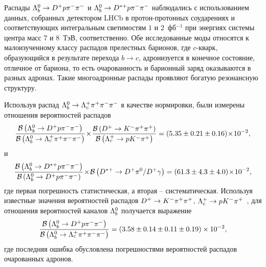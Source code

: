 \clearpage
{}
\label{sec:conclusion}

Распады $\Lb\to\Dp\p\pim\pim$ и $\Lb\to\Dstarp\p\pim\pim$ наблюдались 
с использованием данных, собранных детектором LHCb в протон-протонных 
соударениях и соответствующих интегральным светимостям $1$ 
и $2$~фб$^{-1}$ при энергиях системы центра масс 7 и 8~ТэВ, 
соответственно. Обе исследованные моды относятся к малоизученному классу 
распадов прелестных барионов, где $c$\nobreakdash-кварк, образующийся 
в результате перехода $b \to c$, адронизуется в конечное состояние, 
отличное от бариона, то есть очарованность и барионный заряд оказываются 
в разных адронах. Такие многоадронные распады проявляют богатую 
резонансную структуру.

Используя распад $\Lb\to\Lc\pip\pim\pim$ в качестве нормировки, 
были измерены отношения вероятностей распадов
\[ \frac{\BR{\Lb\to\Dp\p\pim\pim}}{\BR{\Lb\to\Lc\pip\pim\pim}}
  \!\times\!\frac{\BR{\Dp\to\Km\pip\pip}}{\BR{\Lc\to\p\Km\pip}}
  = (5.35 \pm 0.21 \pm 0.16) \!\times\! 10^{-2}, \]
и
\[ \frac{\BR{\Lb\to\Dstarp\p\pim\pim}}{\BR{\Lb\to\Dp\p\pim\pim}}
  \!\times\!\BR{\Dstarp\to\Dp\piz/\Dp\gamma}
  = (61.3 \pm 4.3 \pm 4.0) \!\times\! 10^{-2}, \]
где первая погрешность статистическая, а вторая -- систематическая.
%
Используя известные значения вероятностей распадов $\Dp\to\Km\pip\pip$, 
$\Lc\to\p\Km\pip$~\cite{PDG}, для отношения вероятностей каналов ${\Lambda_b^0}$ 
получается выражение
\[ \frac{\BR{\Lb\to\Dp\p\pim\pim}}{\BR{\Lb\to\Lc\pip\pim\pim}}
  = (3.58 \pm 0.14 \pm 0.11 \pm 0.19) \times 10^{-2}, \]
где последняя ошибка обусловлена погрешностями вероятностей распадов 
очарованных адронов.


